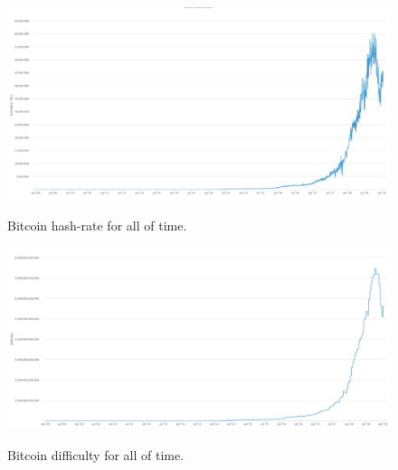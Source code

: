 \begin{figure}[h!]
  \centering
  \includegraphics[width = 15cm]{./figures/hashrate-all-time}\\[0.5cm] 
  \caption{Bitcoin hash-rate for all of time. \cite{RefWorks:doc:5c3b0c9de4b066461b1b87bb}}
  \label{fig:all-time-hash-rate}
\end{figure}

\begin{figure}[h!]
  \centering
  \includegraphics[width = 15cm]{./figures/difficulty-all-time}\\[0.5cm] 
  \caption{Bitcoin difficulty for all of time. \cite{RefWorks:doc:5c3b1ac4e4b0ea619644bcc1}}
  \label{fig:all-time-difficulty}
\end{figure}


